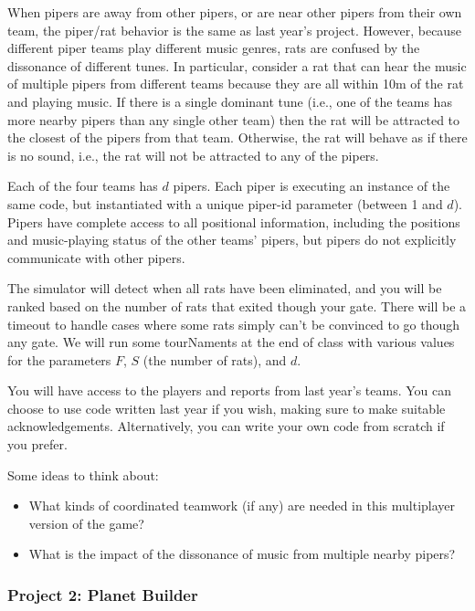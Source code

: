 When pipers are away from other pipers, or are near other pipers from
their own team, the piper/rat behavior is the same as last year's
project.  However, because different piper teams play different music
genres, rats are confused by the dissonance of different tunes.  In
particular, consider a rat that can hear the music of multiple pipers
from different teams because they are all within 10m of the rat and
playing music.  If there is a single dominant tune (i.e., one of the
teams has more nearby pipers than any single other team) then the rat
will be attracted to the closest of the pipers from that team.
Otherwise, the rat will behave as if there is no sound, i.e., the rat
will not be attracted to any of the pipers.

Each of the four teams has $d$ pipers.  Each piper is executing an
instance of the same code, but instantiated with a unique piper-id
parameter (between 1 and $d$).  Pipers have complete access to all
positional information, including the positions and music-playing status of
the other teams' pipers, but pipers do not explicitly communicate with other
pipers.

The simulator will detect when all rats have been eliminated, and you will be ranked based
on the number of rats that exited though your gate.  There will be a timeout to
handle cases where some rats simply can't be convinced
to go though any gate.  We will run some tourNaments at the end of class
with various values for the parameters $F$, $S$ (the number of rats), and $d$.

You will have access to the players and reports from last year's
teams.  You can choose to use code written last year if you wish,
making sure to make suitable acknowledgements.  Alternatively, you can
write your own code from scratch if you prefer.

Some ideas to think about:
\begin{itemize}
\item What kinds of coordinated teamwork (if any) are needed in this multiplayer version of the game?
\item What is the impact of the dissonance of music from multiple nearby pipers?
\end{itemize}

\subsubsection{Project 2: Planet Builder}

